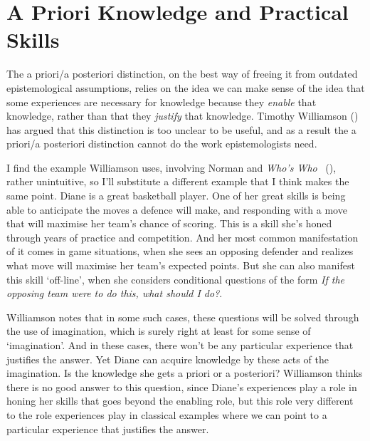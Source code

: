 \documentclass[
  11pt,
  letterpaper,
  DIV=11,
  numbers=noendperiod,
  twoside]{scrartcl}
\begin{document}
\section{A Priori Knowledge and Practical
Skills}\label{aprioriknowledgeandpracticalskills}

The a priori/a posteriori distinction, on the best way of freeing it
from outdated epistemological assumptions, relies on the idea we can
make sense of the idea that some experiences are necessary for knowledge
because they \emph{enable} that knowledge, rather than that they
\emph{justify} that knowledge. Timothy Williamson
() has argued that this distinction
is too unclear to be useful, and as a result the a priori/a posteriori
distinction cannot do the work epistemologists need.

I find the example Williamson uses, involving Norman and \emph{Who's
Who} ~(), rather
unintuitive, so I'll substitute a different example that I think makes
the same point. Diane is a great basketball player. One of her great
skills is being able to anticipate the moves a defence will make, and
responding with a move that will maximise her team's chance of scoring.
This is a skill she's honed through years of practice and competition.
And her most common manifestation of it comes in game situations, when
she sees an opposing defender and realizes what move will maximise her
team's expected points. But she can also manifest this skill `off-line',
when she considers conditional questions of the form \emph{If the
opposing team were to do this, what should I do?}.

Williamson notes that in some such cases, these questions will be solved
through the use of imagination, which is surely right at least for some
sense of `imagination'. And in these cases, there won't be any
particular experience that justifies the answer. Yet Diane can acquire
knowledge by these acts of the imagination. Is the knowledge she gets a
priori or a posteriori? Williamson thinks there is no good answer to
this question, since Diane's experiences play a role in honing her
skills that goes beyond the enabling role, but this role very different
to the role experiences play in classical examples where we can point to
a particular experience that justifies the answer.
\end{document}
